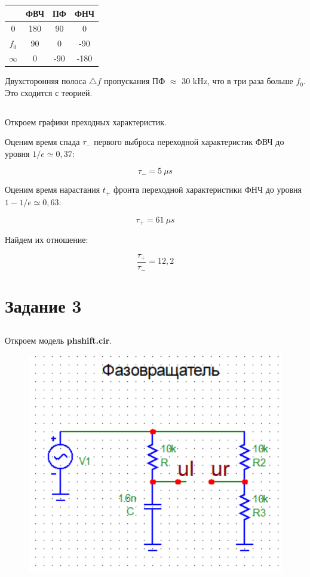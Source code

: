 \documentclass{article}
\begin{document}
\begin{center}
\begin{tabular}{|c|c|c|c|}
\hline 
 & ФВЧ & ПФ & ФНЧ \\ 
\hline 
0 & 180 & 90 & 0 \\ 
\hline 
$f_0$ & 90 & 0 & -90 \\ 
\hline 
$\infty$ & 0 & -90 & -180 \\ 
\hline 
\end{tabular} 
\end{center}

Двухсторонняя полоса $\triangle f$ пропускания ПФ $\approx$ 30 kHz, что в три раза больше $f_0$. Это сходится с теорией.

\subsection{}
Откроем графики преходных характеристик.

Оценим время спада $\tau_-$ первого выброса переходной характеристик ФВЧ до уровня $1/e \simeq 0,37$:

\[\tau_-= 5 \: \mu s\]

Оценим время нарастания $t_+$ фронта переходной характеристики ФНЧ до уровня $1 - 1/e \simeq 0,63$:

\[\tau_+ = 61 \: \mu s\]

Найдем их отношение:

\[\frac{\tau_+}{\tau_-} = 12,2\]

\section {Задание 3}
\subsection{}
Откроем модель \textbf{phshift.cir}.

\begin{figure}[H]
\centering
\includegraphics[scale=0.4]{phshift_omg.png}
\label{fig:Image1}
\end{figure} 
\end{document}
